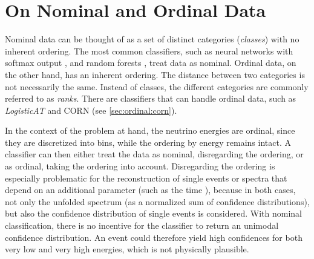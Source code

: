 \section{On Nominal and Ordinal Data}
Nominal data can be thought of as a set of distinct categories
  (\emph{classes})
with no inherent ordering.
The most common classifiers,
  such as
    neural networks with softmax output \cite{dsea_samuel},
    and random forests \cite{hymon2021seasonal},
treat data as nominal.
%
Ordinal data, on the other hand,
has an inherent ordering.
The distance between two categories is not necessarily the same. %
Instead of classes,
  the different categories are commonly referred to as \emph{ranks}.
There are classifiers that can handle ordinal data,
such as
  \emph{LogisticAT} \cite{logisticat, dsea_jan} %
  and \ac{CORN} (see \autoref{sec:ordinal:corn}).

In the context of the problem at hand,
  the neutrino energies are ordinal,
    since they are discretized into bins,
      while the ordering by energy remains intact.
%
A classifier can then either
  treat the data as nominal,
    disregarding the ordering,
  or as ordinal,
    taking the ordering into account.
Disregarding the ordering
is especially problematic for the reconstruction of
  single events
  or spectra that depend on an additional parameter
    (such as the time \cite{hymon2021seasonal}),
because in both cases,
  not only the unfolded spectrum
    (as a normalized sum of confidence distributions),
  but also the confidence distribution of single events
  is considered.
With nominal classification,
  there is no incentive for the classifier
    to return an unimodal confidence distribution.
An event could therefore yield
  high confidences for both very low and very high energies,
  which is not physically plausible.


